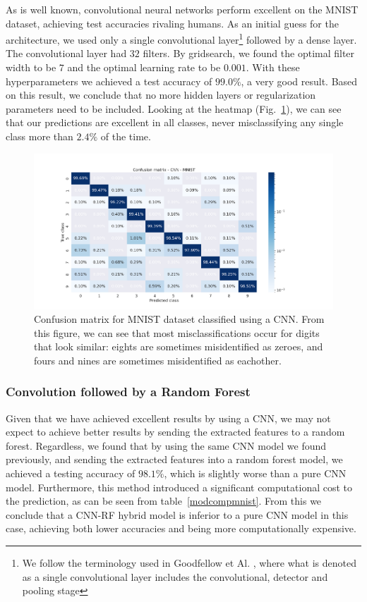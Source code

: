 \documentclass[onecolumn,10pt,cleanfoot]{asme2ej}
\begin{document}
As is well known, convolutional neural networks perform excellent on the MNIST dataset, achieving test accuracies rivaling humans. As an initial guess for the architecture, we used only a single convolutional layer\footnote{We follow the terminology used in Goodfellow et Al. \cite[336]{gbc}, where what is denoted as a single convolutional layer includes the convolutional, detector and pooling stage} followed by a dense layer. The convolutional layer had $32$ filters. By gridsearch, we found the optimal filter width to be $7$ and the optimal learning rate to be $0.001$. With these hyperparameters we achieved a test accuracy of $99.0\%$, a very good result. Based on this result, we conclude that no more hidden layers or regularization parameters need to be included. Looking at the heatmap (Fig.~\ref{mnistheatmap_cnn}), we can see that our predictions are excellent in all classes, never misclassifying any single class more than $2.4\%$ of the time.

\begin{figure}[H]
\centerline{\includegraphics[width=8in]{figure/conf_cnn_MNIST.png}}
\caption{Confusion matrix for MNIST dataset classified using a CNN. From this figure, we can see that most misclassifications occur for digits that look similar: eights are sometimes misidentified as zeroes, and fours and nines are sometimes misidentified as eachother.}
\label{mnistheatmap_cnn}
\end{figure}

\subsubsection{Convolution followed by a Random Forest}

Given that we have achieved excellent results by using a CNN, we may not expect to achieve better results by sending the extracted features to a random forest. Regardless, we found that by using the same CNN model we found previously, and sending the extracted features into a random forest model, we achieved a testing accuracy of $98.1\%$, which is slightly worse than a pure CNN model. Furthermore, this method introduced a significant computational cost to the prediction, as can be seen from table~\ref{modcompmnist}. From this we conclude that a CNN-RF hybrid model is inferior to a pure CNN model in this case, achieving both lower accuracies and being more computationally expensive.
\end{document}
